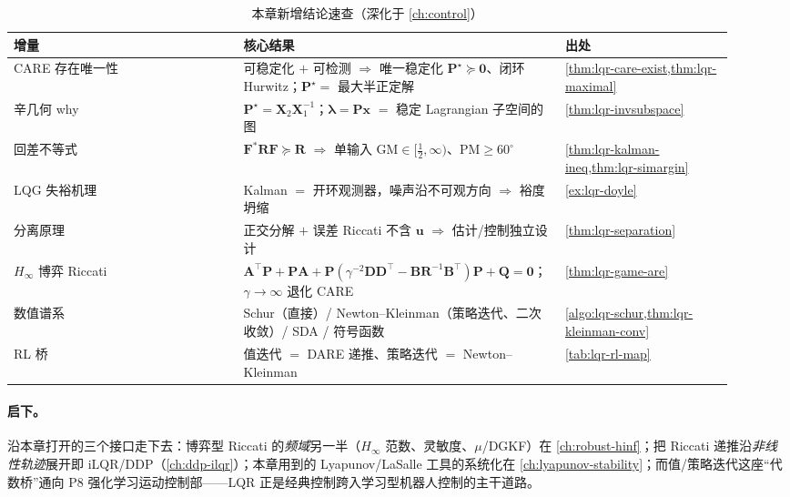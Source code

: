 \begin{table}[H]\centering\small
\caption{本章新增结论速查（深化于 \cref{ch:control}）}
\label{tab:lqr-deep-summary}
\begin{tabular}{p{0.30\linewidth}p{0.40\linewidth}p{0.22\linewidth}}
\toprule
增量 & 核心结果 & 出处 \\
\midrule
CARE 存在唯一性 & 可稳定化 $+$ 可检测 $\Rightarrow$ 唯一稳定化 $\mathbf P^\star\succeq\mathbf0$、闭环 Hurwitz；$\mathbf P^\star=$ 最大半正定解 & \cref{thm:lqr-care-exist,thm:lqr-maximal} \\
辛几何 why & $\mathbf P^\star=\mathbf X_2\mathbf X_1^{-1}$；$\boldsymbol\lambda=\mathbf P\mathbf x$ $=$ 稳定 Lagrangian 子空间的图 & \cref{thm:lqr-invsubspace} \\
回差不等式 & $\mathbf F^*\mathbf R\mathbf F\succeq\mathbf R$ $\Rightarrow$ 单输入 $\mathrm{GM}\in[\tfrac12,\infty)$、$\mathrm{PM}\ge60^\circ$ & \cref{thm:lqr-kalman-ineq,thm:lqr-simargin} \\
LQG 失裕机理 & Kalman $=$ 开环观测器，噪声沿不可观方向 $\Rightarrow$ 裕度坍缩 & \cref{ex:lqr-doyle} \\
分离原理 & 正交分解 $+$ 误差 Riccati 不含 $\mathbf u$ $\Rightarrow$ 估计/控制独立设计 & \cref{thm:lqr-separation} \\
$H_\infty$ 博弈 Riccati & $\mathbf A^\top\mathbf P+\mathbf P\mathbf A+\mathbf P(\gamma^{-2}\mathbf D\mathbf D^\top-\mathbf B\mathbf R^{-1}\mathbf B^\top)\mathbf P+\mathbf Q=\mathbf0$；$\gamma\to\infty$ 退化 CARE & \cref{thm:lqr-game-are} \\
数值谱系 & Schur（直接）/ Newton--Kleinman（策略迭代、二次收敛）/ SDA / 符号函数 & \cref{algo:lqr-schur,thm:lqr-kleinman-conv} \\
RL 桥 & 值迭代 $=$ DARE 递推、策略迭代 $=$ Newton--Kleinman & \cref{tab:lqr-rl-map} \\
\bottomrule
\end{tabular}
\end{table}

\paragraph{启下。}沿本章打开的三个接口走下去：博弈型 Riccati 的\emph{频域}另一半（$H_\infty$ 范数、灵敏度、$\mu$/DGKF）在 \cref{ch:robust-hinf}；把 Riccati 递推沿\emph{非线性轨迹}展开即 iLQR/DDP（\cref{ch:ddp-ilqr}）；本章用到的 Lyapunov/LaSalle 工具的系统化在 \cref{ch:lyapunov-stability}；而值/策略迭代这座“代数桥”通向 P8 强化学习运动控制部——LQR 正是经典控制跨入学习型机器人控制的主干道路。

